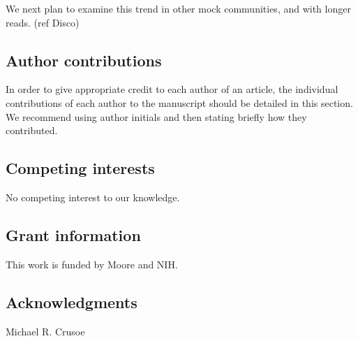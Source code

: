 \documentclass[10pt,a4paper,twocolumn]{article}
\begin{document}
We next plan to examine this trend in other mock communities, and with
longer reads. (ref Disco)

%

\subsection*{Author contributions}
In order to give appropriate credit to each author of an article, the
individual contributions of each author to the manuscript should be
detailed in this section. We recommend using author initials and then
stating briefly how they contributed.

\subsection*{Competing interests}
No competing interest to our knowledge.

\subsection*{Grant information}
This work is funded by Moore and NIH.

\subsection*{Acknowledgments}
Michael R. Crusoe

{\small }

\bigskip




\end{document}
